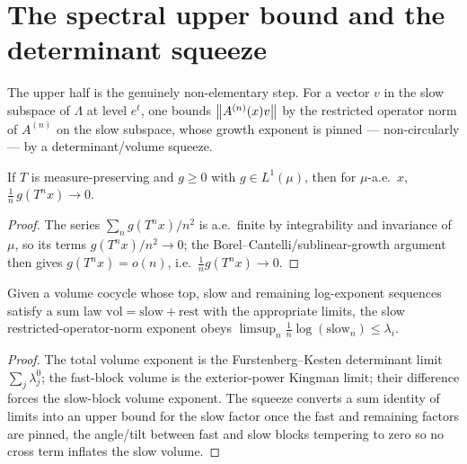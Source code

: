 \section{The spectral upper bound and the determinant squeeze}

The upper half is the genuinely non-elementary step. For a vector \(v\) in the slow subspace of
\(\Lambda\) at level \(e^t\), one bounds \(\left\lVert A^{(n)}(x)v \right\rVert\) by the restricted operator norm of
\(A^{(n)}\) on the slow subspace, whose growth exponent is pinned --- non-circularly --- by a
determinant/volume squeeze.

\begin{lemma}[Tempering]\label{tempering_posLog}
  \leanok
  If \(T\) is measure-preserving and \(g\ge0\) with \(g\in L^1(\mu)\), then for \(\mu\)-a.e.\ \(x\),
  \(\tfrac1n\,g(T^n x)\to 0\).
\end{lemma}
\begin{proof}\leanok
  The series \(\sum_n g(T^n x)/n^{2}\) is a.e.\ finite by integrability and invariance of \(\mu\),
  so its terms \(g(T^n x)/n^2\to0\); the Borel--Cantelli/sublinear-growth argument then gives
  \(g(T^n x)=o(n)\), i.e.\ \(\tfrac1n g(T^n x)\to0\).
\end{proof}

\begin{lemma}\label{limsup_topSlow_le_of_squeeze}
  \leanok
  Given a volume cocycle whose top, slow and remaining log-exponent sequences satisfy a sum law
  \(\mathrm{vol} = \mathrm{slow} + \mathrm{rest}\) with the appropriate limits, the slow
  restricted-operator-norm exponent obeys
  \(\limsup_n \tfrac1n\log(\mathrm{slow}_n) \le \lambda_i\).
\end{lemma}
\begin{proof}\leanok
  The total volume exponent is the Furstenberg--Kesten determinant limit \(\sum_j\lambda^0_j\); the
  fast-block volume is the exterior-power Kingman limit; their difference forces the slow-block
  volume exponent. The squeeze converts a sum identity of limits into an upper bound for the slow
  factor once the fast and remaining factors are pinned, the angle/tilt between fast and slow
  blocks tempering to zero so no cross term inflates the slow volume.
\end{proof}

